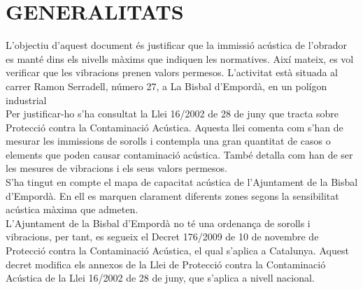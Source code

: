 \chapter{\uppercase{Generalitats}}
L'objectiu d'aquest document és justificar que la immissió acústica de l'obrador es manté dins els nivells màxims que indiquen les normatives. Així mateix, es vol verificar que les vibracions prenen valors permesos. L'activitat està situada al carrer Ramon Serradell, número 27, a La Bisbal d'Empordà, en un polígon industrial\\
\newline Per justificar-ho s'ha consultat la Llei 16/2002 de 28 de juny que tracta sobre Protecció contra la Contaminació Acústica. Aquesta llei comenta com s'han de mesurar les immissions de sorolls i contempla una gran quantitat de casos o elements que poden causar contaminació acústica. També detalla com han de ser les mesures de vibracions i els seus valors permesos.\\
\newline S'ha tingut en compte el mapa de capacitat acústica de l'Ajuntament de la Bisbal d'Empordà. En ell es marquen clarament diferents zones segons la sensibilitat acústica màxima que admeten.\\
\newline L'Ajuntament de la Bisbal d'Empordà no té una ordenança de sorolls i vibracions, per tant, es segueix el Decret 176/2009 de 10 de novembre de Protecció contra la Contaminació Acústica, el qual s'aplica a Catalunya. Aquest decret modifica els annexos de la Llei de Protecció contra la Contaminació Acústica de la Llei 16/2002 de 28 de juny, que s'aplica a nivell nacional.


\clearpage